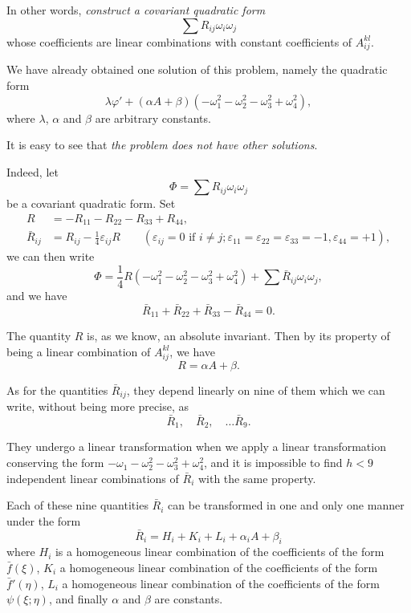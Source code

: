 \documentclass[leqno,12pt]{article}
\makeatletter
\let\old@phi\phi
\let\old@varphi\varphi
\let\old@epsilon\epsilon
\let\old@varepsilon\varepsilon
\let\phi\old@varphi
\let\varphi\old@phi
\let\epsilon\old@varepsilon
\let\varepsilon\old@epsilon
\theoremstyle{shape1}
\theoremstyle{shape0}
\theoremstyle{shape2}
\theoremstyle{definition}
\makeatother
\begin{document}
In other words, \emph{construct a covariant quadratic form}
\[
\sum{R}_{ij}\omega_{i}\omega_{j}
\]
whose coefficients are linear combinations with constant coefficients of $A^{kl}_{ij}$.

We have already obtained one solution of this problem, namely the quadratic form
\[
\lambda\phi'+(\alpha A+\beta)(-\omega_{1}^{2}-\omega_{2}^{2}-\omega_{3}^{2}+\omega_{4}^{2}),
\]
where $\lambda$, $\alpha$ and $\beta$ are arbitrary constants.

It is easy to see that \emph{the problem does not have other solutions}.

Indeed, let
\[
\Phi=\sum R_{ij}{\omega_{i}\omega_{j}}
\]
be a covariant quadratic form. Set
\begin{align*}
  R&=-R_{11}-R_{22}-R_{33}+R_{44},\\
  \bar R_{ij}&=R_{ij}-\frac{1}{4}\epsilon_{ij}R\qquad(\epsilon_{ij}= 0 \text{ if } i\neq j;\epsilon_{11}=\epsilon_{22}=\epsilon_{33}=-1,\epsilon_{44}=+1),
\end{align*}
we can then write
\[
\Phi=\frac{1}{4}R(-\omega_{1}^{2}-\omega_{2}^{2}-\omega_{3}^{2}+\omega_{4}^{2})+\sum\bar R_{ij}\omega_{i}\omega_{j},
\]
and we have
\[
\bar R_{11}+\bar R_{22}+\bar R_{33}-\bar R_{44}=0.
\]

The quantity $R$ is, as we know, an absolute invariant. Then by its property of being a linear combination of $A^{kl}_{ij}$, we have
\[
R=\alpha A+\beta.
\]

As for the quantities $\bar R_{ij}$, they depend linearly on nine of them which we can write, without being more precise, as
\[
\bar R_{1},\quad\bar R_{2},\quad\dots\bar R_{9}.
\]

They undergo a linear transformation when we apply a linear transformation conserving the form $-\omega_{1}^{}-\omega_{2}^{2}-\omega_{3}^{2}+\omega_{4}^{2}$, and it is impossible to find $h<9$ independent linear combinations of $\bar R_{i}$ with the same property.

Each of these nine quantities $\bar R_{i}$ can be transformed in one and only one manner under the form
\[
\bar R_{i}=H_{i}+K_{i}+L_{i}+\alpha_{i}A+\beta_{i}
\]
where $H_{i}$ is a homogeneous linear combination of the coefficients of the form $\bar f(\xi)$, $K_{i}$ a homogeneous linear combination of the coefficients of the form $\bar f'(\eta)$, $L_{i}$ a homogeneous linear combination of the coefficients of the form $\psi(\xi;\eta)$, and finally $\alpha$ and $\beta$ are constants.
\end{document}
